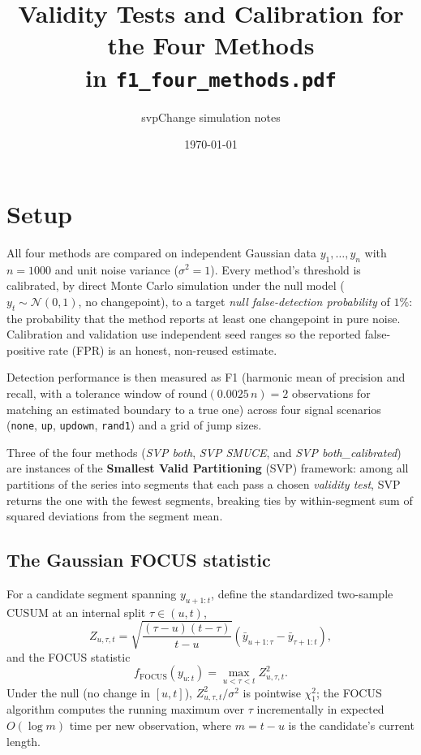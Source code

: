 \documentclass[11pt]{article}
\title{Validity Tests and Calibration for the Four Methods\\
in \texttt{f1\_four\_methods.pdf}}
\author{svpChange simulation notes}
\date{\today}
\begin{document}
\maketitle

\section{Setup}

All four methods are compared on independent Gaussian data $y_1,\dots,y_n$
with $n = 1000$ and unit noise variance ($\sigma^2 = 1$). Every method's
threshold is calibrated, by direct Monte Carlo simulation under the null
model ($y_t \sim \mathcal N(0,1)$, no changepoint), to a target
\emph{null false-detection probability} of $1\%$: the probability that the
method reports at least one changepoint in pure noise. Calibration and
validation use independent seed ranges so the reported false-positive rate
(FPR) is an honest, non-reused estimate.

Detection performance is then measured as F1 (harmonic mean of precision
and recall, with a tolerance window of $\mathrm{round}(0.0025\,n) = 2$
observations for matching an estimated boundary to a true one) across four
signal scenarios (\texttt{none}, \texttt{up}, \texttt{updown}, \texttt{rand1})
and a grid of jump sizes.

Three of the four methods (\emph{SVP both}, \emph{SVP SMUCE}, and
\emph{SVP both\_calibrated}) are instances of the \textbf{Smallest Valid
Partitioning} (SVP) framework: among all partitions of the series into
segments that each pass a chosen \emph{validity test}, SVP returns the one
with the fewest segments, breaking ties by within-segment sum of squared
deviations from the segment mean.

\subsection*{The Gaussian FOCUS statistic}

For a candidate segment spanning $y_{u+1:t}$, define the standardized
two-sample CUSUM at an internal split $\tau \in (u,t)$,
\[
Z_{u,\tau,t} = \sqrt{\frac{(\tau-u)(t-\tau)}{t-u}}
\left(\bar y_{u+1:\tau} - \bar y_{\tau+1:t}\right),
\]
and the FOCUS statistic
\[
f_{\mathrm{FOCUS}}(y_{u:t}) = \max_{u<\tau<t} Z_{u,\tau,t}^2 .
\]
Under the null (no change in $[u,t]$), $Z_{u,\tau,t}^2/\sigma^2$ is
pointwise $\chi^2_1$; the FOCUS algorithm computes the running maximum over
$\tau$ incrementally in expected $O(\log m)$ time per new observation, where
$m = t-u$ is the candidate's current length.
\end{document}
